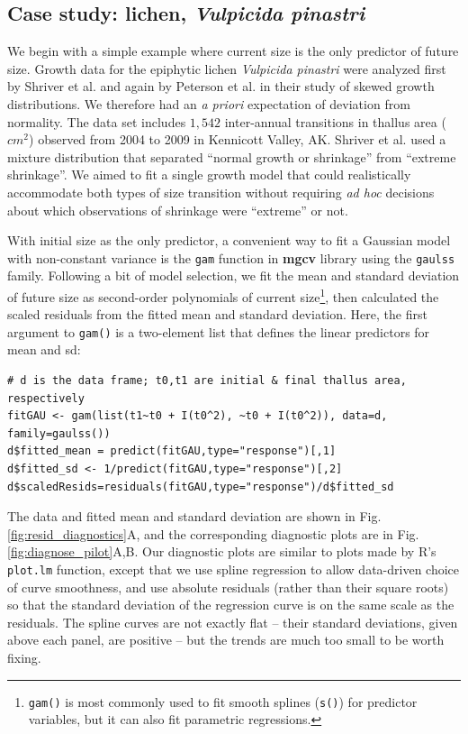 \documentclass[12pt]{article}
\begin{document}
\begin{spacing}{1.9}
\section{Case study: lichen, \emph{Vulpicida pinastri}}
\label{sec:lichenCaseStudy} 
We begin with a simple example where current size is the only predictor of future size. 
Growth data for the epiphytic lichen \emph{Vulpicida pinastri} were analyzed first by Shriver et al. \citeyear{shriver2012comparative} and again by Peterson et al. \citeyear{peterson2019improving} in their study of skewed growth distributions. 
We therefore had an \emph{a priori} expectation of deviation from normality. 
The data set includes $1,542$ inter-annual transitions in thallus area ($cm^2$) observed from 2004 to 2009 in Kennicott Valley, AK. 
Shriver et al. \citeyear{shriver2012comparative} used a mixture distribution that separated ``normal growth or shrinkage'' from ``extreme shrinkage''. 
We aimed to fit a single growth model that could realistically accommodate both types of size transition without requiring \emph{ad hoc} decisions about which observations of shrinkage were ``extreme'' or not. 

With initial size as the only predictor, a convenient way to fit a Gaussian model with non-constant variance is the \texttt{gam} function in \textbf{mgcv} library \citep{wood-2017} using the \texttt{gaulss} family. 
Following a bit of model selection, we fit the mean and standard deviation of future size as second-order polynomials of current size\footnote{\texttt{gam()} is most commonly used to fit smooth splines (\texttt{s()}) for predictor variables, but it can also fit parametric regressions.}, then calculated the scaled residuals from the fitted mean and standard deviation.
Here, the first argument to \texttt{gam()} is a two-element list that defines the linear predictors for mean and sd:
\begin{lstlisting}
# d is the data frame; t0,t1 are initial & final thallus area, respectively
fitGAU <- gam(list(t1~t0 + I(t0^2), ~t0 + I(t0^2)), data=d, family=gaulss())
d$fitted_mean = predict(fitGAU,type="response")[,1]
d$fitted_sd <- 1/predict(fitGAU,type="response")[,2]
d$scaledResids=residuals(fitGAU,type="response")/d$fitted_sd
\end{lstlisting}
The data and fitted mean and standard deviation are shown in Fig. \ref{fig:resid_diagnostics}A, and the corresponding diagnostic plots are in Fig. \ref{fig:diagnose_pilot}A,B. 
Our diagnostic plots are similar to plots made by R's \texttt{plot.lm} function, except that we use spline regression to allow data-driven choice 
of curve smoothness, and use absolute residuals (rather than their square roots) so that the standard deviation of the regression curve is 
on the same scale as the residuals. 
The spline curves are not exactly flat  -- their standard deviations, given above each panel, are positive -- but the trends are much too small to be worth fixing. 


\end{spacing}
\end{document}
